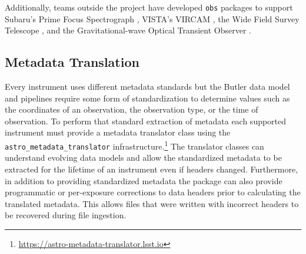 Additionally, teams outside the project have developed \texttt{obs} packages to support Subaru's Prime Focus Spectrograph \citep{2020SPIE11447E..7VW}, VISTA's VIRCAM \citep{2015A&A...575A..25S},
the Wide Field Survey Telescope \citep[WFST;][]{2025arXiv250115018C}, and the Gravitational-wave Optical Transient Observer \citep[GOTO;][]{2021PASA...38....4M}.

\subsection{Metadata Translation}

Every instrument uses different metadata standards but the Butler data model and pipelines require some form of standardization to determine values such as the coordinates of an observation, the observation type, or the time of observation.
To perform that standard extraction of metadata each supported instrument must provide a metadata translator class using the \texttt{astro\_metadata\_translator} infrastructure.\footnote{\url{https://astro-metadata-translator.lsst.io}}
The translator classes can understand evolving data models and allow the standardized metadata to be extracted for the lifetime of an instrument even if headers changed.
Furthermore, in addition to providing standardized metadata the package can also provide programmatic or per-exposure corrections to data headers prior to calculating the translated metadata.
This allows files that were written with incorrect headers to be recovered during file ingestion.

